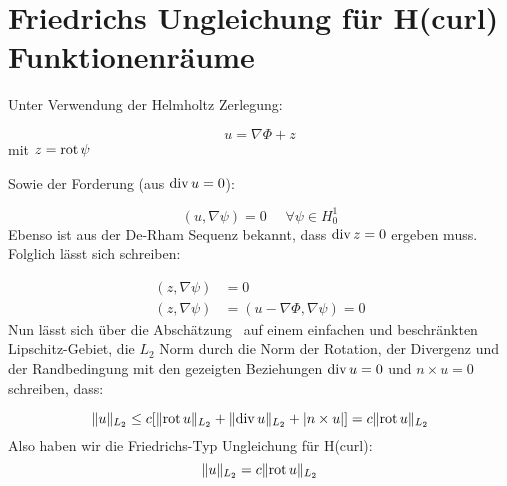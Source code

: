\newpage
\section{Friedrichs Ungleichung f\"ur H(curl) Funktionenr\"aume}
Unter Verwendung der Helmholtz Zerlegung:
\par
\begin{equation}
	u = \nabla \Phi + z
\end{equation}
mit $z = \mathrm{rot}\,\psi$
\par
Sowie der Forderung (aus $\mathrm{div}\, u = 0$):
\par
\begin{equation}
	(u,\nabla\psi) = 0 ~~~~~~\forall \psi\in H^1_0
\end{equation}
Ebenso ist aus der De-Rham Sequenz bekannt, dass $\mathrm{div}\, z = 0$ ergeben muss. Folglich l\"asst sich schreiben:
\par
\begin{align}
	(z, \nabla\psi) &= 0\\
	(z, \nabla\psi) &= (u - \nabla\Phi, \nabla\psi) = 0  
\end{align}
Nun l\"asst sich \"uber die Absch\"atzung~\cite[Lemma 4.2]{hiptmair2002finite} auf einem einfachen und beschr\"ankten Lipschitz-Gebiet, die $L_2$ Norm durch die Norm der Rotation, der Divergenz und der Randbedingung mit den gezeigten Beziehungen $\mathrm{div}\, u = 0$ und $n\times u = 0$ schreiben, dass:
\par
\begin{equation}
	\|u\|_{L_2} \leq c[\|\mathrm{rot}\, u\|_{L_2} + \|\mathrm{div}\, u\|_{L_2} + |n\times u|] = c\|\mathrm{rot}\, u\|_{L_2}
\end{equation}
Also haben wir die Friedrichs-Typ Ungleichung f\"ur H(curl):
\begin{equation}
	\|u\|_{L_2} = c\|\mathrm{rot}\, u\|_{L_2}
\end{equation}
